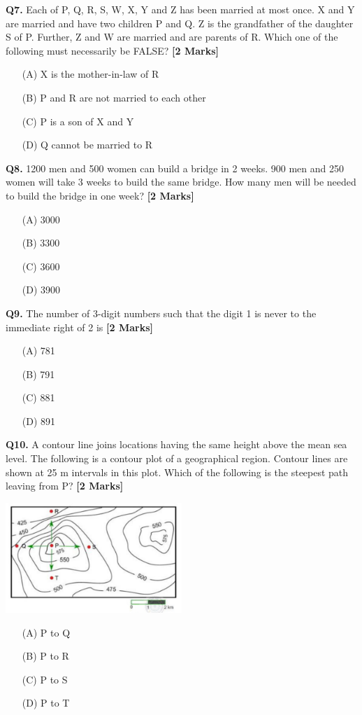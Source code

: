 \documentclass[11pt]{article}
\newcommand{\questionb}[2]{
    \noindent\textbf{Q#2.} #1 \hfill \textbf{[2 Marks]}
}
\begin{document}
\questionb{Each of P, Q, R, S, W, X, Y and Z has been married at most once. X and Y are married and have two children P and Q. Z is the grandfather of the daughter S of P. Further, Z and W are married and are parents of R. Which one of the following must necessarily be FALSE?}{7}
\begin{enumerate}
    \item[(A)] X is the mother-in-law of R  
    \item[(B)] P and R are not married to each other  
    \item[(C)] P is a son of X and Y  
    \item[(D)] Q cannot be married to R  
\end{enumerate}
\vspace{0.5cm}

\questionb{1200 men and 500 women can build a bridge in 2 weeks. 900 men and 250 women will take 3 weeks to build the same bridge. How many men will be needed to build the bridge in one week?}{8}
\begin{enumerate}
    \item[(A)] 3000  
    \item[(B)] 3300  
    \item[(C)] 3600  
    \item[(D)] 3900  
\end{enumerate}
\vspace{0.5cm}

\questionb{The number of 3-digit numbers such that the digit 1 is never to the immediate right of 2 is}{9}
\begin{enumerate}
    \item[(A)] 781  
    \item[(B)] 791  
    \item[(C)] 881  
    \item[(D)] 891  
\end{enumerate}
\vspace{0.5cm}

\questionb{A contour line joins locations having the same height above the mean sea level. The following is a contour plot of a geographical region. Contour lines are shown at 25 m intervals in this plot. Which of the following is the steepest path leaving from P?}{10}
\begin{center}
\includegraphics[width=0.5\textwidth]{figures/10.png}
\end{center}
\begin{enumerate}
    \item[(A)] P to Q  
    \item[(B)] P to R  
    \item[(C)] P to S  
    \item[(D)] P to T  
\end{enumerate}
\vspace{0.5cm}
\end{document}
